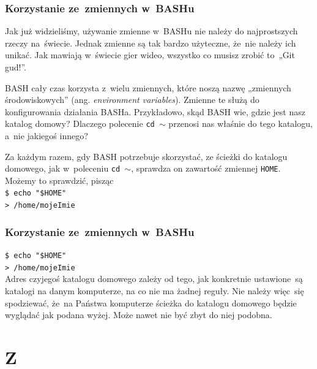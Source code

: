 \documentclass[10pt,t]{beamer}
\begin{document}
\begin{frame}
  \frametitle{Korzystanie ze~zmiennych w~BASHu}


  Jak już widzieliśmy, używanie zmienne w~BASHu nie należy do najprostszych
  rzeczy na~świecie. Jednak zmienne są tak bardzo użyteczne, że~nie należy
  ich unikać. Jak mawiają w~świecie gier wideo, wszystko co musisz zrobić
  to~„Git gud!”.

  BASH cały czas korzysta z~wielu zmiennych, które noszą nazwę „zmiennych
  środowiskowych” (ang. \textit{environment variables}). Zmienne te służą
  do konfigurowania działania BASHa. Przykładowo, skąd BASH wie, gdzie
  jest nasz katalog domowy? Dlaczego polecenie \texttt{cd $\sim$}
  przenosi nas właśnie do tego katalogu, a~nie jakiegoś innego?

  Za każdym razem, gdy BASH potrzebuje skorzystać, ze ścieżki do katalogu
  domowego, jak w~poleceniu \texttt{cd $\sim$}, sprawdza on zawartość
  zmiennej \texttt{HOME}. Możemy to sprawdzić, pisząc \\
  \texttt{\$ echo "\$HOME"} \\
  \texttt{> /home/mojeImie}

\end{frame}





\begin{frame}
  \frametitle{Korzystanie ze~zmiennych w~BASHu}


  \texttt{\$ echo "\$HOME"} \\
  \texttt{> /home/mojeImie} \\
  Adres czyjegoś katalogu domowego zależy od tego, jak konkretnie
  ustawione~są katalogi na danym komputerze, na co nie ma żadnej reguły.
  Nie należy więc~się spodziewać, że~na Państwa komputerze ścieżka do
  katalogu domowego będzie wyglądać jak podana wyżej. Może nawet nie być
  zbyt do niej podobna.

\end{frame}





\section{Z}
\end{document}
